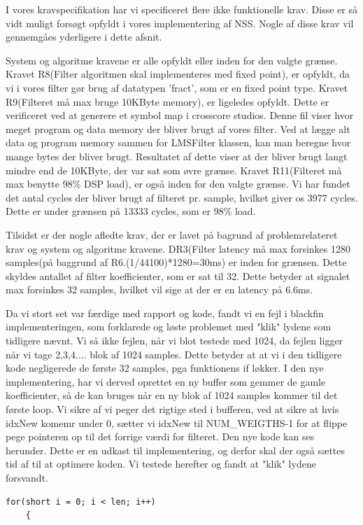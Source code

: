 \begin{description}[align=left]
I vores kravspecifikation har vi specificeret flere ikke funktionelle krav. Disse er så vidt muligt forsøgt opfyldt i vores implementering af NSS. Nogle af disse krav vil gennemgåes yderligere i dette afsnit.

System og algoritme kravene er alle opfyldt eller inden for den valgte grænse. Kravet R8(Filter algoritmen skal implementeres med fixed point), er opfyldt, da vi i vores filter gør brug af datatypen 'fract', som er en fixed point type. Kravet R9(Filteret må max bruge 10KByte memory), er ligeledes opfyldt. Dette er verificeret ved at generere et symbol map i crosscore studios. Denne fil viser hvor meget program og data memory der bliver brugt af vores filter. Ved at lægge alt data og program memory sammen for LMSFilter klassen, kan man beregne hvor mange bytes der bliver brugt. Resultatet af dette viser at der bliver brugt langt mindre end de 10KByte, der var sat som øvre grænse. Kravet R11(Filteret må max benytte 98\% DSP load), er også inden for den valgte grænse. Vi har fundet det antal cycles der bliver brugt af filteret pr. sample, hvilket giver os 3977 cycles. Dette er under grænsen på 13333 cycles, som er 98\% load. 

Tilsidst er der nogle afledte krav, der er lavet på bagrund af problemrelateret krav og system og algoritme kravene. DR3(Filter latency må max forsinkes 1280 samples(på baggrund af R6.(1/44100)*1280=30ms) er inden for grænsen. Dette skyldes antallet af filter koefficienter, som er sat til 32. Dette betyder at signalet max forsinkes 32 samples, hvilket vil sige at der er en latency på 6.6ms. 



\item [Løsning i sidste time.] Da vi stort set var færdige med rapport og kode, fandt vi en fejl i blackfin implementeringen, som forklarede og løste problemet med "klik" lydene som tidligere nævnt. 
Vi så ikke fejlen, når vi blot testede med 1024, da fejlen ligger når vi tage 2,3,4.... blok af 1024 samples. Dette betyder at at vi i den tidligere kode negligerede de første 32 samples, pga funktionens if løkker. I den nye implementering, har vi derved oprettet en ny buffer som gemmer de gamle koefficienter, så de kan bruges når en ny blok af 1024 samples kommer til det første loop. Vi sikre af vi peger det rigtige sted i bufferen, ved at sikre at hvis idxNew komemr under 0, sætter vi idxNew til NUM\_WEIGTHS-1 for at flippe pege pointeren op til det forrige værdi for filteret. Den nye kode kan ses herunder. Dette er en udkast til implementering, og derfor skal der også sættes tid af til at optimere koden. Vi testede herefter og fandt at "klik" lydene forsvandt. \\
\begin{lstlisting}
for(short i = 0; i < len; i++)
	{


\end{lstlisting}
\end{description}

